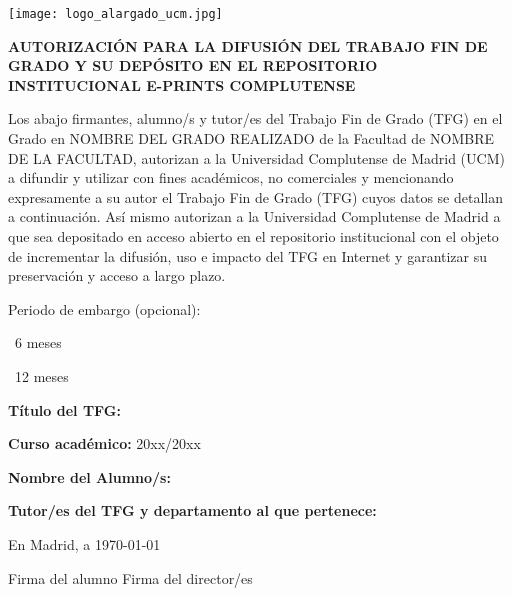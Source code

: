 {
	\newcommand{\checkbox}{{\fboxsep=-.15pt\fbox{\rule{0pt}{1.5ex}\rule{1.5ex}{0pt}}}}
	
	\setlength{\parskip}{14pt}

	\noindent\texttt{[image: logo\_alargado\_ucm.jpg]}
	\vspace{0.5cm}
	\begin{center}
		\textbf{AUTORIZACIÓN PARA LA DIFUSIÓN DEL TRABAJO FIN DE GRADO Y SU DEPÓSITO EN EL REPOSITORIO INSTITUCIONAL E-PRINTS COMPLUTENSE}
	\end{center}
	\vspace{0.5cm}

	\noindent Los abajo firmantes, alumno/s y tutor/es del Trabajo Fin de Grado (TFG) en el Grado en 
	NOMBRE DEL GRADO REALIZADO de la Facultad de NOMBRE DE LA FACULTAD, autorizan a la Universidad Complutense de Madrid (UCM) 
	a difundir y utilizar con fines académicos, no comerciales y mencionando expresamente 
	a su autor el Trabajo Fin de Grado (TFG) cuyos datos se detallan a continuación. 
	Así mismo autorizan a la Universidad Complutense de Madrid a que sea depositado en acceso abierto
	en el repositorio institucional con el objeto de incrementar la difusión, 
	uso e impacto del TFG en Internet y garantizar su preservación y acceso a largo plazo. 

	\noindent Periodo de embargo (opcional): 

	\quad \checkbox\ 6 meses 
	
	\quad \checkbox\ 12 meses 

	\vspace{0.5cm}

	\noindent \textbf{Título del TFG: }

	\noindent \textbf{Curso académico: } 20xx/20xx    
	
	\noindent \textbf{Nombre del Alumno/s: }
	
	\noindent \textbf{Tutor/es del TFG y departamento al que pertenece: }

	\vspace{1cm}

	\begin{center}
		En Madrid, a \today

		\vspace{1cm}

		Firma del alumno \hfill Firma del director/es
	\end{center}
}